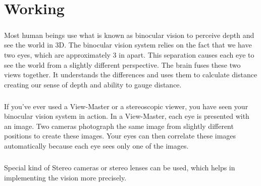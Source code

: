 \chapter{Working}
\paragraph{} Most human beings use what is known as binocular vision to perceive depth and see the world in 3D. The binocular vision system relies on the fact that we have two eyes, which are approximately 3 in apart. This separation causes each eye to see the world from a slightly different perspective. The brain fuses these two views together. It understands the differences and uses them to calculate distance creating our sense of depth and ability to gauge distance.

\paragraph{} If you've ever used a View-Master or a stereoscopic viewer, you have seen your binocular vision system in action. In a View-Master, each eye is presented with an image. Two cameras photograph the same image from slightly different positions to create these images. Your eyes can then correlate these images automatically because each eye sees only one of the images.

\paragraph{} Special kind of Stereo cameras or stereo lenses can be used, which helps in implementing the vision more precisely.


